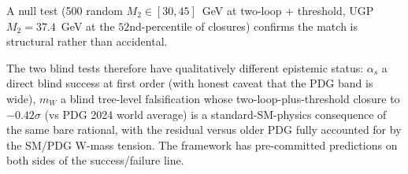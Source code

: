 \documentclass[11pt]{article}
\theoremstyle{remark}
\begin{document}
\begin{appendices}
\smallskip
A null test (500 random $M_2 \in [30,45]$~GeV at two-loop + threshold, UGP $M_2 = 37.4$~GeV at the $52$nd-percentile of closures) confirms the match is structural rather than accidental.

\smallskip
The two blind tests therefore have qualitatively different epistemic status: $\alpha_s$ a direct blind success at first order (with honest caveat that the PDG band is wide), $m_W$ a blind tree-level falsification whose two-loop-plus-threshold closure to $-0.42\sigma$ (vs PDG 2024 world average) is a standard-SM-physics consequence of the same bare rational, with the residual versus older PDG fully accounted for by the SM/PDG W-mass tension.  The framework has pre-committed predictions on both sides of the success/failure line.

\end{appendices}




\end{document}
